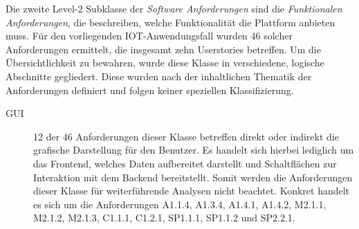 Die zweite Level-2 Subklasse der \textit{Software Anforderungen} sind die \textit{Funktionalen Anforderungen}, die beschreiben, welche Funktionalität die Plattform anbieten muss. Für den vorliegenden IOT-Anwendungsfall wurden 46 solcher Anforderungen ermittelt, die insgesamt zehn Userstories betreffen. Um die Übersichtlichkeit zu bewahren, wurde diese Klasse in verschiedene, logische Abschnitte gegliedert. Diese wurden nach der inhaltlichen Thematik der Anforderungen definiert und folgen keiner speziellen Klassifizierung.

\begin{description}
  \item[GUI] 12 der 46 Anforderungen dieser Klasse betreffen direkt oder indirekt die grafische Darstellung für den Benutzer. Es handelt sich hierbei lediglich um das Frontend, welches Daten aufbereitet darstellt und Schaltflächen zur Interaktion mit dem Backend bereitstellt. Somit werden die Anforderungen dieser Klasse für weiterführende Analysen nicht beachtet. Konkret handelt es sich um die Anforderungen A1.1.4, A1.3.4, A1.4.1, A1.4.2, M2.1.1, M2.1.2, M2.1.3, C1.1.1, C1.2.1, SP1.1.1, SP1.1.2 und SP2.2.1.


\end{description}
